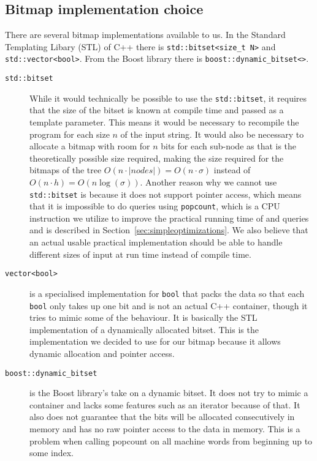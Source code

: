 \subsection{Bitmap implementation choice}
There are several bitmap implementations available to us. In the Standard Templating Libary (STL) of C++ there is \texttt{std::bitset<size\_t N>} and \texttt{std::vector<bool>}. From the Boost library there is \texttt{boost::dynamic\_bitset<>}.
\begin{description}
\item[\texttt{std::bitset}] While it would technically be possible to use the \texttt{std::bitset}, it requires that the size of the bitset is known at compile time and passed as a template parameter. This means it would be necessary to recompile the program for each size $n$ of the input string. 
It would also be necessary to allocate a bitmap with room for $n$ bits for each sub-node as that is the theoretically possible size required, making the size required for the bitmaps of the tree $O(n \cdot |nodes|) = O(n \cdot \sigma)$ instead of $O(n \cdot h) = O(n\log(\sigma))$.
Another reason why we cannot use \texttt{std::bitset} is because it does not support pointer access, which means that it is impossible to do queries using \texttt{popcount}, which is a CPU instruction we utilize to improve the practical running time of  and  queries and is described in Section~\ref{sec:simpleoptimizations}.
We also believe that an actual usable practical implementation should be able to handle different sizes of input at run time instead of compile time. 

\item[\texttt{vector<bool>}] is a specialised implementation for \texttt{bool} that packs the data so that each \texttt{bool} only takes up one bit and is not an actual C++ container, though it tries to mimic some of the behaviour. 
It is basically the STL implementation of a dynamically allocated bitset. This is the implementation we decided to use for our bitmap because it allows dynamic allocation and pointer access.

\item[\texttt{boost::dynamic\_bitset}] is the Boost library's take on a dynamic bitset. 
It does not try to mimic a container and lacks some features such as an iterator because of that. 
It also does not guarantee that the bits will be allocated consecutively in memory and has no raw pointer access to the data in memory. 
This is a problem when calling popcount on all machine words from beginning up to some index.
\end{description}

